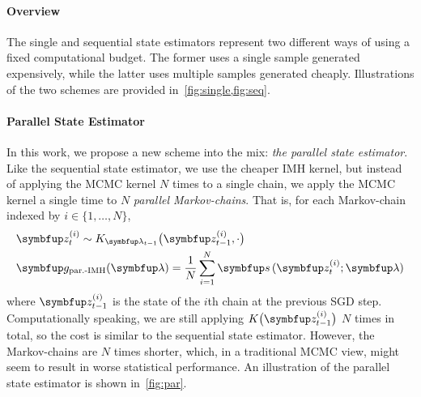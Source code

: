 \vspace{-0.08in}
\paragraph{Overview}
The single and sequential state estimators represent two different ways of using a fixed computational budget.
The former uses a single sample generated expensively, while the latter uses multiple samples generated cheaply.
Illustrations of the two schemes are provided in~\cref{fig:single,fig:seq}.

\vspace{-0.08in}
\paragraph{Parallel State Estimator}
In this work, we propose a new scheme into the mix: \textit{the parallel state estimator}.
Like the sequential state estimator, we use the cheaper IMH kernel, but instead of applying the MCMC kernel \(N\) times to a single chain, we apply the MCMC kernel a single time to \(N\) \textit{parallel Markov-chains}.
That is, for each Markov-chain indexed by \(i \in \{1, \ldots, N\}\),
%
\vspace{-0.05in}
\begin{align*}
  &\vz_{t}^{(i)} \sim K_{\vlambda_{t-1}}\big(\vz_{t-1}^{(i)}, \cdot \big) \\
  &\vg_{\text{par.-IMH}}(\vlambda) = \frac{1}{N} \sum_{i=1}^N \vs\,(\vz_{t}^{(i)}; \vlambda)
\end{align*}
%
where \(\vz_{t-1}^{(i)}\) is the state of the \(i\)th chain at the previous SGD step.
Computationally speaking, we are still applying \(K\big(\vz_{t-1}^{(i)}\big)\) \(N\) times in total, so the cost is similar to the sequential state estimator.
However, the Markov-chains are \(N\) times shorter, which, in a traditional MCMC view, might seem to result in worse statistical performance.
An illustration of the parallel state estimator is shown in~\cref{fig:par}.

\vspace{-0.05in}
